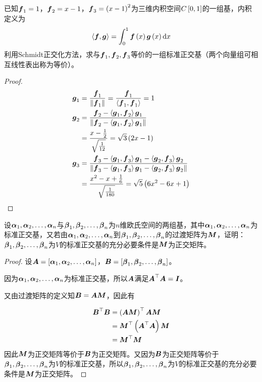 \begin{problem}
已知\(\vecf_1=1\)，\(\vecf_2=x-1\)，\(\vecf_3=\mypar{x-1}^2\)为三维内积空间\(C\mat{0,1}\)的一组基，内积定义为
\begin{equation*}
    \indot{\vecf}{\vecg}=\int_0^1\vecf\mypar{x}\vecg\mypar{x}\mathrm{d}x
\end{equation*}
利用Schmidt正交化方法，求与\(\vecf_1,\vecf_2,\vecf_3\)等价的一组标准正交基（两个向量组可相互线性表出称为等价）。
\end{problem}
\begin{proof}
    \begin{align*}
        \vecg_1 & =\frac{\vecf_1}{\Abs{\vecf_1}}=\frac{\vecf_1}{\indot{\vecf_1}{\vecf_1}}=1                                                                                      \\
        \vecg_2 & =\frac{\vecf_2-\indot{\vecg_1}{\vecf_2}\vecg_1}{\Abs{\vecf_2-\indot{\vecg_1}{\vecf_2}\vecg_1}}                                                                 \\
                & =\frac{x-\frac{1}{2}}{\sqrt{\frac{1}{12}}}=\sqrt3\mypar{2x-1}                                                                                                  \\
        \vecg_3 & =\frac{\vecf_3-\indot{\vecg_1}{\vecf_3}\vecg_1-\indot{\vecg_2}{\vecf_3}\vecg_2}{\Abs{\vecf_3-\indot{\vecg_1}{\vecf_3}\vecg_1-\indot{\vecg_2}{\vecf_3}\vecg_2}} \\
                & =\frac{x^2-x+\frac{1}{6}}{\sqrt{\frac{1}{180}}}=\sqrt5\mypar{6x^2-6x+1}
    \end{align*}
\end{proof}

\begin{problem}
设\(\enums{\vecal}{n}\)与\(\enums{\vecbeta}{n}\)为\(n\)维欧氏空间的两组基，其中\(\enums{\vecal}{n}\)为标准正交基，又若由\(\enums{\vecal}{n}\)到\(\enums{\vecbeta}{n}\)的过渡矩阵为\(\matm\)，证明：\(\enums{\vecbeta}{n}\)为\(V\)的标准正交基的充分必要条件是\(\matm\)为正交矩阵。
\end{problem}
\begin{proof}
    设\(\mata=\mat{\enums{\vecal}{n}}\)，\(\matb=\mat{\enums{\vecbeta}{n}}\)。

    因为\(\enums{\vecal}{n}\)为标准正交基，所以\(\mata\)满足\(\mata^\top\mata=\mati\)。

    又由过渡矩阵的定义知\(\matb=\mata\matm\)，因此有

    \begin{align*}
        \matb^\top\matb & =\mypar{\mata\matm}^\top\mata\matm      \\
                        & =\matm^\top\mypar{\mata^\top\mata}\matm \\
                        & =\matm^\top\matm
    \end{align*}
    因此\(\matm\)为正交矩阵等价于\(\matb\)为正交矩阵。又因为\(\matb\)为正交矩阵等价于\(\enums{\vecbeta}{n}\)为\(V\)的标准正交基，所以\(\enums{\vecbeta}{n}\)为\(V\)的标准正交基的充分必要条件是\(\matm\)为正交矩阵。
\end{proof}

